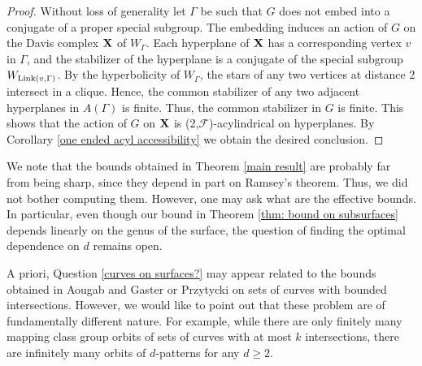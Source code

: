 \begin{proof}
	Without loss of generality let $\Gamma$ be such that $G$ does not embed into a conjugate of a proper special subgroup. 
	The embedding induces an action of $G$ on the Davis complex $\mathbf{X}$ of $W_\Gamma$.
	Each hyperplane of $\mathbf{X}$ has a corresponding vertex $v$ in $\Gamma$, and the stabilizer of the hyperplane is a conjugate of the special subgroup $W_{\mathrm{Link}(v,\Gamma)}$. 
	By the hyperbolicity of $W_\Gamma$, the stars of any two vertices at distance 2 intersect in a clique. Hence, the common stabilizer of any two adjacent hyperplanes in $A(\Gamma)$ is finite. Thus, the common stabilizer in $G$ is finite. 
	This shows that the action of $G$ on $\mathbf{X}$ is (2,$\mathcal{F}$)-acylindrical on hyperplanes. 
	By Corollary \ref{one ended acyl accessibility} we obtain the desired conclusion.
\end{proof}


We note that the bounds obtained in Theorem \ref{main result} are probably far from being sharp, since they depend in part on Ramsey's theorem. 
Thus, we did not bother computing them.
However, one may ask what are the effective bounds. 
In particular, even though our bound in Theorem \ref{thm: bound on subsurfaces} depends linearly on the genus of the surface, the question of finding the optimal dependence on $d$ remains open. 

A priori, Question \ref{curves on surfaces?} may appear related to the bounds obtained in  Aougab and Gaster \cite{AoGa15}  or Przytycki \cite{Prz15} on sets of curves with bounded intersections. 
However, we would like to point out that these problem are of fundamentally different nature. 
For example, while there are only finitely many mapping class group orbits of sets of curves with at most $k$ intersections, there are infinitely many orbits of $d$-patterns for any $d\ge 2$. 
